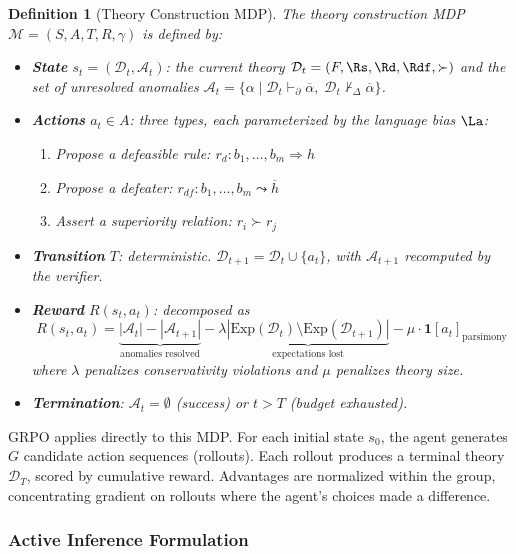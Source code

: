 \documentclass{article}
\newtheorem{definition}{Definition}
\newcommand{\D}{\mathcal{D}}
\newcommand{\Exp}{\mathrm{Exp}}
\newcommand{\pPartial}{\vdash_{\partial}}
\newcommand{\defto}{\Rightarrow}
\newcommand{\defeatto}{\leadsto}
\newcommand{\comp}[1]{\overline{#1}}
\begin{document}
\begin{definition}[Theory Construction MDP]
The theory construction MDP $\mathcal{M} = (S, A, T, R, \gamma)$ is defined by:
\begin{itemize}[nosep]
    \item \textbf{State} $s_t = (\D_t, \mathcal{A}_t)$: the current theory $\D_t = (F, \Rs, \Rd, \Rdf, {\succ})$ and the set of unresolved anomalies $\mathcal{A}_t = \{\alpha \mid \D_t \pPartial \comp{\alpha},\; \D_t \not\vdash_\Delta \comp{\alpha}\}$.
    \item \textbf{Actions} $a_t \in A$: three types, each parameterized by the language bias $\La$:
    \begin{enumerate}[nosep]
        \item Propose a defeasible rule: $r_d\colon b_1, \ldots, b_m \defto h$
        \item Propose a defeater: $r_{df}\colon b_1, \ldots, b_m \defeatto \comp{h}$
        \item Assert a superiority relation: $r_i \succ r_j$
    \end{enumerate}
    \item \textbf{Transition} $T$: deterministic. $\D_{t+1} = \D_t \cup \{a_t\}$, with $\mathcal{A}_{t+1}$ recomputed by the verifier.
    \item \textbf{Reward} $R(s_t, a_t)$: decomposed as
    \[
        R(s_t, a_t) = \underbrace{|\mathcal{A}_t| - |\mathcal{A}_{t+1}|}_{\text{anomalies resolved}} - \lambda \underbrace{|\Exp(\D_t) \setminus \Exp(\D_{t+1})|}_{\text{expectations lost}} - \mu \cdot \mathbf{1}[a_t]_{\text{parsimony}}
    \]
    where $\lambda$ penalizes conservativity violations and $\mu$ penalizes theory size.
    \item \textbf{Termination}: $\mathcal{A}_t = \emptyset$ (success) or $t > T$ (budget exhausted).
\end{itemize}
\end{definition}

GRPO applies directly to this MDP. For each initial state $s_0$, the agent generates $G$ candidate action sequences (rollouts). Each rollout produces a terminal theory $\D_T$, scored by cumulative reward. Advantages are normalized within the group, concentrating gradient on rollouts where the agent's choices made a difference.

\subsubsection{Active Inference Formulation}
\end{document}
